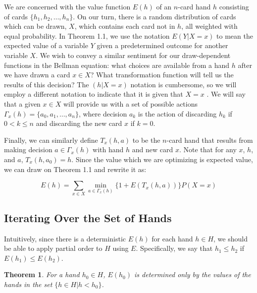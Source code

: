 \documentclass[letter,12pt]{article}
\newtheorem{theorem}{Theorem}
\begin{document}
We are concerned with the value function $E(h)$ of an $n$-card hand $h$ consisting of cards $\{h_1,h_2,\ldots,h_n\}$. On our turn, there is a random distribution of cards which can be drawn, $X$, which contains each card not in $h$, all weighted with equal probability. In Theorem 1.1, we use the notation $E(Y | X = x)$ to mean the expected value of a variable $Y$ given a predetermined outcome for another variable $X$. We wish to convey a similar sentiment for our draw-dependent functions in the Bellman equation: what choices are available from a hand $h$ after we have drawn a card $x \in X$? What transformation function will tell us the results of this decision? The $(h | X=x )$ notation is cumbersome, so we will employ a different notation to indicate that it is given that $X=x$ . We will say that a given $x \in X$  will provide us with a set of possible actions $\Gamma_x (h) = \{a_0,a_1,\ldots,a_n\}$, where decision $a_k$ is the action of discarding $h_k$ if $0 < k \leq n$  and discarding the new card $x$ if $k=0$.

Finally, we can similarly define $T_x(h,a)$ to be the $n$-card hand that results from making decision $a \in \Gamma_x(h)$ with hand $h$ and new card $x$. Note that for any $x$, $h$, and $a$, $T_x(h,a_0)=h$. Since the value which we are optimizing is expected value, we can draw on Theorem 1.1 and rewrite it as: 

$$E(h) = \sum_{x \in X} \min_{a \in \Gamma_x (h)} \{1 + E(T_x(h,a))\} P(X = x)$$

\subsection{Iterating Over the Set of Hands}

Intuitively, since there is a deterministic $E(h)$ for each hand $h \in H$, we should be able to apply partial order to $H$ using $E$. Specifically, we say that $h_1 \leq h_2$ if $E(h_1) \leq E(h_2)$.

\begin{theorem}
For a hand $h_0 \in H$, $E(h_0)$ is determined only by the values of the hands in the set $\{h \in H | h < h_0\}$.
\end{theorem}
\end{document}
